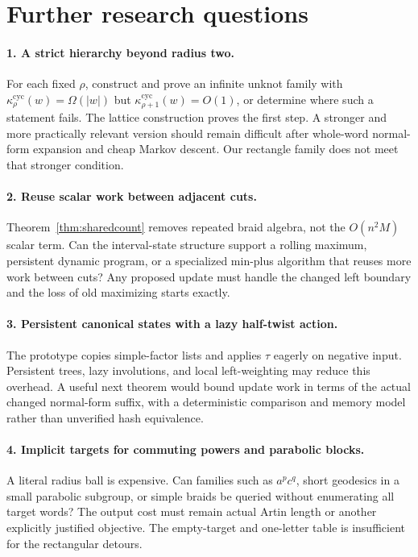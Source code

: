 \documentclass[11pt,a4paper]{article}
\theoremstyle{definition}\newtheorem{definition}[theorem]{Definition}
\theoremstyle{remark}\newtheorem{remark}[theorem]{Remark}
\newcommand{\kc}[1]{\kappa^{\mathrm{cyc}}_{#1}}
\begin{document}
\section{Further research questions}

\paragraph{1. A strict hierarchy beyond radius two.}
For each fixed $\rho$, construct and prove an infinite unknot family with
$\kc{\rho}(w)=\Omega(|w|)$ but $\kc{\rho+1}(w)=O(1)$, or determine where
such a statement fails. The lattice construction proves the first step.
A stronger and more practically relevant version should remain difficult
after whole-word normal-form expansion and cheap Markov descent. Our
rectangle family does not meet that stronger condition.

\paragraph{2. Reuse scalar work between adjacent cuts.}
Theorem~\ref{thm:sharedcount} removes repeated braid algebra, not the
$O(n^2M)$ scalar term. Can the interval-state structure support a rolling
maximum, persistent dynamic program, or a specialized min-plus algorithm
that reuses more work between cuts? Any proposed update must handle the
changed left boundary and the loss of old maximizing starts exactly.

\paragraph{3. Persistent canonical states with a lazy half-twist action.}
The prototype copies simple-factor lists and applies $\tau$ eagerly on
negative input. Persistent trees, lazy involutions, and local left-weighting
may reduce this overhead. A useful next theorem would bound update work in
terms of the actual changed normal-form suffix, with a deterministic
comparison and memory model rather than unverified hash equivalence.

\paragraph{4. Implicit targets for commuting powers and parabolic blocks.}
A literal radius ball is expensive. Can families such as $a^pc^q$,
short geodesics in a small parabolic subgroup, or simple braids be queried
without enumerating all target words? The output cost must remain actual
Artin length or another explicitly justified objective. The empty-target
and one-letter table is insufficient for the rectangular detours.
\end{document}
